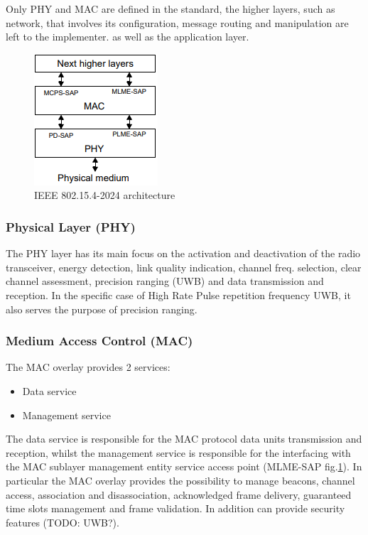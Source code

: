 \documentclass[conference]{IEEEtran}
\begin{document}
Only PHY and MAC are defined in the standard, the higher layers, such as network,
that involves its configuration, message routing and manipulation are left to the implementer.
as well as the application layer.\\

\begin{figure}[!h]
  \centering
  \includegraphics[width=.5\linewidth]{layers}
  \caption{IEEE 802.15.4-2024 architecture}
  \label{fig:layers}
\end{figure}

\subsubsection{Physical Layer (PHY)}
The PHY layer has its main focus on the activation and deactivation of the radio transceiver,
energy detection, link quality indication, channel freq. selection, clear channel assessment,
precision ranging (UWB) and data transmission and reception.
In the specific case of High Rate Pulse repetition frequency UWB, it also serves the purpose 
of precision ranging.

\subsubsection{Medium Access Control (MAC)}
The MAC overlay provides 2 services:
\begin{itemize}
    \item Data service
    \item Management service
\end{itemize}
The data service is responsible for the MAC protocol data units transmission and reception,
whilst the management service is responsible for the interfacing with the MAC sublayer 
management entity service access point (MLME-SAP fig.\ref{fig:layers}).
In particular the MAC overlay provides the possibility to manage beacons, channel access,
association and disassociation, acknowledged frame delivery, guaranteed time slots management
and frame validation. In addition can provide security features (TODO: UWB?).
\end{document}
